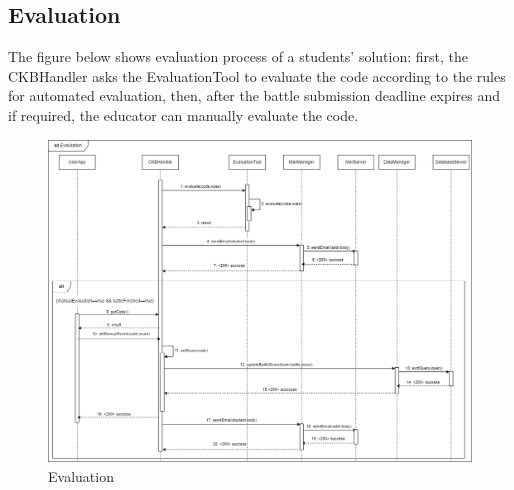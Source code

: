 \subsection{Evaluation}
The figure below shows evaluation process of a students' solution: first, the CKBHandler asks the EvaluationTool to evaluate the 
code according to the rules for automated evaluation, then, after the battle submission deadline expires and if required, the 
educator can manually evaluate the code.\\
\begin{figure}[H]
    \centering
    \includegraphics[width=1\textwidth]{images/seq_diagrams/evaluation_DD.png}
    \caption{Evaluation}
\end{figure}
\clearpage

